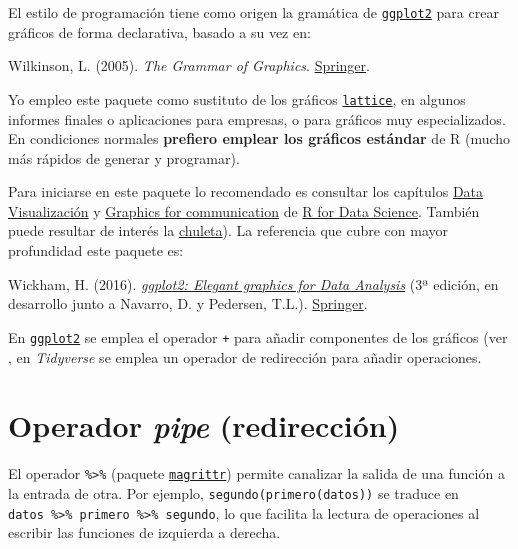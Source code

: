 \documentclass[
]{book}
\theoremstyle{break}
\theoremstyle{nonumberplain}
\begin{document}
El estilo de programación tiene como origen la gramática de \href{https://ggplot2.tidyverse.org}{\texttt{ggplot2}} para crear gráficos de forma declarativa, basado a su vez en:

Wilkinson, L. (2005). \emph{The Grammar of Graphics}. \href{https://www.google.es/books/edition/The_Grammar_of_Graphics/YGgUswEACAAJ?hl=es}{Springer}.

Yo empleo este paquete como sustituto de los gráficos \href{http://lattice.r-forge.r-project.org/}{\texttt{lattice}}, en algunos informes finales o aplicaciones para empresas, o para gráficos muy especializados.
En condiciones normales \textbf{prefiero emplear los gráficos estándar} de R (mucho más rápidos de generar y programar).

Para iniciarse en este paquete lo recomendado es consultar los capítulos \href{https://r4ds.had.co.nz/data-visualisation.html}{Data Visualización} y \href{https://r4ds.had.co.nz/graphics-for-communication.html}{Graphics for communication} de \href{https://r4ds.had.co.nz}{R for Data Science}.
También puede resultar de interés la \href{https://github.com/rstudio/cheatsheets/blob/master/data-visualization.pdf}{chuleta}).
La referencia que cubre con mayor profundidad este paquete es:

Wickham, H. (2016). \emph{\href{https://ggplot2-book.org}{ggplot2: Elegant graphics for Data Analysis}} (3ª edición, en desarrollo junto a Navarro, D. y Pedersen, T.L.). \href{https://www.amazon.com/gp/product/331924275X}{Springer}.

En \href{https://ggplot2.tidyverse.org}{\texttt{ggplot2}} se emplea el operador \texttt{+} para añadir componentes de los gráficos (ver , en \emph{Tidyverse} se emplea un operador de redirección para añadir operaciones.

\hypertarget{pipe}{%
\section{\texorpdfstring{Operador \emph{pipe} (redirección)}{Operador pipe (redirección)}}\label{pipe}}

El operador \texttt{\%\textgreater{}\%} (paquete \href{https://magrittr.tidyverse.org}{\texttt{magrittr}}) permite canalizar la salida de una función a la entrada de otra.
Por ejemplo, \texttt{segundo(primero(datos))} se traduce en \texttt{datos\ \%\textgreater{}\%\ primero\ \%\textgreater{}\%\ segundo}, lo que facilita la lectura de operaciones al escribir las funciones de izquierda a derecha.
\end{document}

